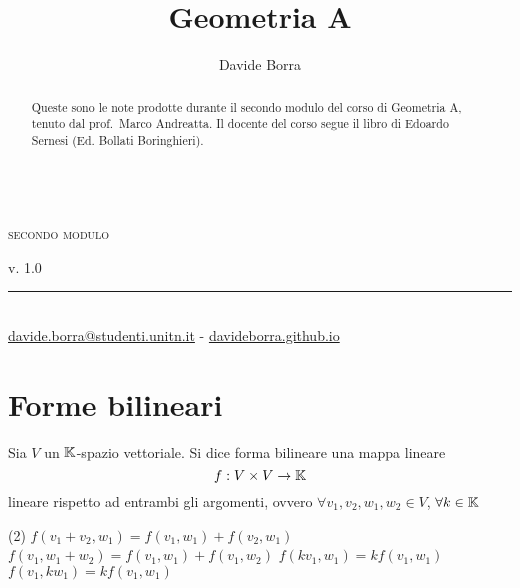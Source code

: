 \documentclass{article}     %
\title{Geometria A}
\author{Davide Borra}
\date{}
\makeatletter
\let\runauthor\@author
\let\runtitle\@title
\makeatother
\begin{document}
\lhead{}
\chead{}
\rfoot{\runauthor}

\begin{titlepage}
    \pagestyle{empty}
    \begin{center}
        \vspace*{\fill}
        \vspace{0.5cm}
        \textbf{\Huge \runtitle}\\\textsc{secondo modulo}\\\vspace{5mm}
        \textsc{\Large \runauthor}
        \vspace{5cm}
    \end{center}
    \vspace*{\fill}
    v. 1.0\\
    \rule{0.8\linewidth}{0.5mm}\\
    {\footnotesize\href{mailto:davide.borra@studenti.unitn.it}{davide.borra@studenti.unitn.it} - \href{http://davideborra.github.io}{davideborra.github.io}}
    \restoregeometry\newpage
    \thispagestyle{empty}
    \begin{abstract}
        \centering Queste sono le note prodotte durante il secondo modulo del corso di Geometria A, tenuto dal prof.~Marco Andreatta. Il docente del corso segue il libro  di Edoardo Sernesi (Ed. Bollati Boringhieri).
    \end{abstract}
    \tableofcontents
    \creativecommons
    
    \lhead{\runtitle}
    \chead{}
    \rhead{\rightmark}
    \rfoot{\runauthor}
\end{titlepage}


\section{Forme bilineari}
\begin{boxdef}
    Sia $V$ un $\mathbb{K}$-spazio vettoriale. Si dice forma bilineare una mappa lineare
    \[f:V\times V\to \mathbb{K}\]
    lineare rispetto ad entrambi gli argomenti, ovvero $\forall v_1, v_2, w_1, w_2 \in V$, $\forall k\in \mathbb{K}$
    \begin{tasks}(2)
        \task[\textbullet] $f(v_1+v_2, w_1)=f(v_1,w_1)+f(v_2,w_1)$
        \task[\textbullet] $f(v_1, w_1+w_2)=f(v_1,w_1)+f(v_1,w_2)$
        \task[\textbullet] $f(kv_1, w_1)=kf(v_1,w_1)$
        \task[\textbullet] $f(v_1, kw_1)=kf(v_1,w_1)$
    \end{tasks}
\end{boxdef}
\end{document}
